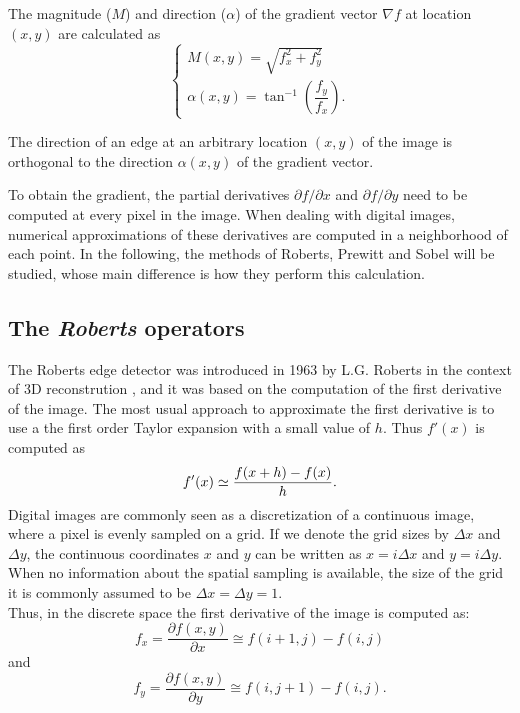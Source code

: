 \documentclass{ipol}
\numberwithin{equation}{section}
\numberwithin{table}{section}
\begin{document}
The magnitude ($M$) and direction ($\alpha$) of the gradient vector $\nabla f$ at location $(x,y)$
are calculated as
\begin{equation}
\label{eq:mag_alpha}
	\begin{cases}
		M(x,y) = \sqrt{f_x^2 + f_y^2} \\
		\alpha(x,y) = \tan^{-1} \left( \dfrac{f_y}{f_x} \right) .
	\end{cases}
\end{equation}

The direction of an edge at an arbitrary location $(x,y)$ of the image is 
orthogonal to the direction $\alpha(x,y)$ of the gradient vector.

To obtain the gradient, the partial derivatives $\partial f/\partial x$ and $\partial f/\partial y$ 
need to be computed at every pixel in the image. When dealing with digital images, numerical approximations 
of these derivatives are computed in a neighborhood of each point. In the following,
the methods of Roberts, Prewitt and Sobel will be studied, whose main difference is how they perform this calculation. 


\subsection{The \textit{Roberts} operators}

\myn{\label{first:roberts}}The Roberts edge detector was introduced in 1963 by L.G. Roberts in the context of 3D reconstrution \cite{im_proc:segmentation:roberts:1963:boundary_extraction}, and it was based on the computation of the first derivative of the image. The most usual approach to approximate the first derivative is to use a the first order Taylor expansion with a small value of $h$. Thus $f'(x)$ is computed as
\begin{equation}
	f'(x) \simeq \frac{f(x+h) - f(x)}{h}.\\
\end{equation}
Digital images are commonly seen as a discretization of a continuous image, where a pixel is evenly sampled on a grid. If we denote the grid sizes by $\Delta x$ and $\Delta y$, the continuous coordinates $x$  and $y$ can be written as $x=i\Delta x$ and $y=i\Delta y$. When no information about the spatial sampling is available, the size of the grid it is commonly assumed to be $\Delta x=\Delta y=1$.\\
Thus, in the discrete space the first derivative of the image is computed as:
\begin{equation}
\label{eq:roberts1}
	f_x = \frac{\partial f(x,y)}{\partial x} \cong f(i+1,j) - f(i,j)
\end{equation}
and
\begin{equation}
\label{eq:roberts2}
	f_y = \frac{\partial f(x,y)}{\partial y} \cong f(i,j+1) - f(i,j).
\end{equation}
\end{document}
